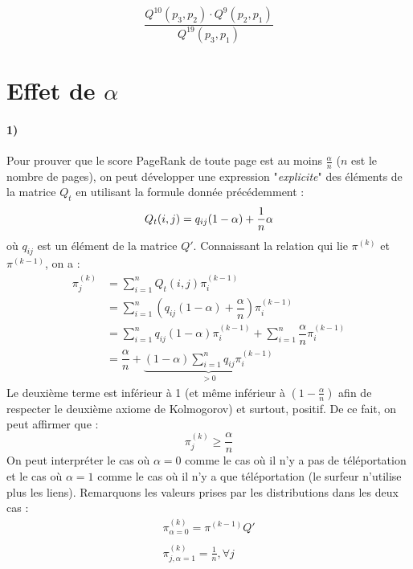 \documentclass[a4paper,titlepage]{report}
\begin{document}
$$\dfrac{Q^{10}(p_3, p_2) \cdot Q^{9}(p_2, p_1)}{Q^{19}(p_3, p_1)}
$$



\section{Effet de $\alpha$}
\label{sec:effet_alpha}
\paragraph{1)}
Pour prouver que le score PageRank de toute page est au moins $\frac{\alpha}{n}$ ($n$ est le nombre de pages), on peut développer une expression "\textit{explicite}" des éléments de la matrice $Q_t$ en utilisant la formule donnée précédemment : 
\[
Q_t(i,j) = q_{ij} (1 - \alpha) + \dfrac{1}{n}\alpha\\
\]
où $q_{ij}$ est un élément de la matrice $Q'$. Connaissant la relation qui lie $\pi^{(k)}$ et $\pi^{(k-1)}$, on a :
\[
\begin{aligned}
\pi^{(k)}_j &= \sum\limits_{i = 1}^n Q_t(i,j)\pi^{(k-1)}_i\\
 &= \sum\limits_{i = 1}^n \left(q_{ij} (1 - \alpha) + \dfrac{\alpha}{n}\right)\pi^{(k-1)}_i\\
 &= \sum\limits_{i = 1}^n q_{ij} (1 - \alpha) \pi^{(k-1)}_i + \sum\limits_{i = 1}^n \dfrac{\alpha}{n} \pi^{(k-1)}_i\\
 &= \dfrac{\alpha}{n} + \underbrace{(1 - \alpha) \sum\limits_{i = 1}^n q_{ij} \pi^{(k-1)}_i}_{> 0}
\end{aligned}
\]
Le deuxième terme est inférieur à 1 (et même inférieur à $(1 - \frac{\alpha}{n})$ afin de respecter le deuxième axiome de Kolmogorov) et surtout, positif. De ce fait, on peut affirmer que :
\[
\pi^{(k)}_j \geq \dfrac{\alpha}{n}
\]
On peut interpréter le cas où $\alpha = 0$ comme le cas où il n'y a pas de téléportation et le cas où $\alpha = 1$ comme le cas où il n'y a que téléportation (le surfeur n'utilise plus les liens). Remarquons les valeurs prises par les distributions dans les deux cas :
\[
\begin{array}{l}
\pi_{\alpha = 0}^{(k)} = \pi^{(k-1)} Q'\\ \\
\pi_{j,\alpha = 1}^{(k)} = \frac{1}{n}, \forall j
\end{array}
\]
\end{document}
